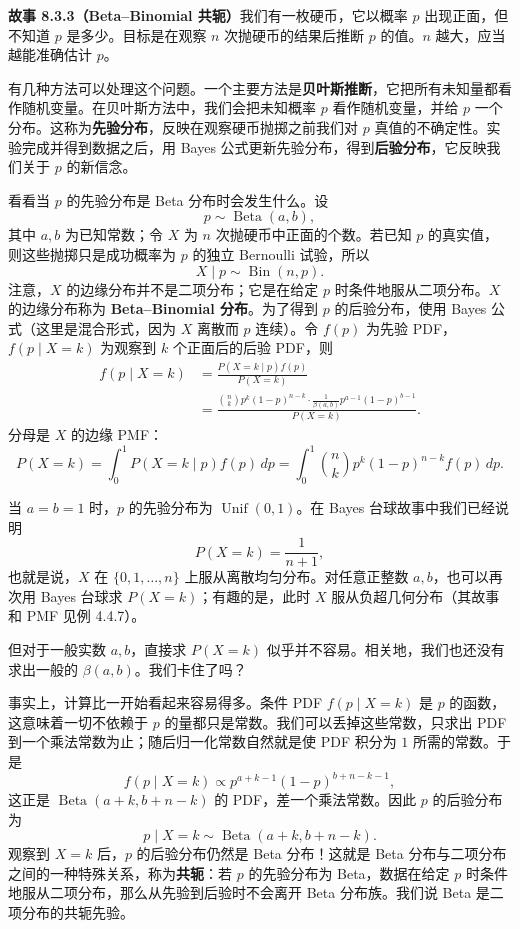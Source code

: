 \documentclass[UTF8,12pt,a4paper,fontset=fandol]{ctexart}
\begin{document}
\noindent\textbf{故事 8.3.3（Beta--Binomial 共轭）}\quad 我们有一枚硬币，它以概率 $p$ 出现正面，但不知道 $p$ 是多少。目标是在观察 $n$ 次抛硬币的结果后推断 $p$ 的值。$n$ 越大，应当越能准确估计 $p$。

有几种方法可以处理这个问题。一个主要方法是\textbf{贝叶斯推断}，它把所有未知量都看作随机变量。在贝叶斯方法中，我们会把未知概率 $p$ 看作随机变量，并给 $p$ 一个分布。这称为\textbf{先验分布}，反映在观察硬币抛掷之前我们对 $p$ 真值的不确定性。实验完成并得到数据之后，用 Bayes 公式更新先验分布，得到\textbf{后验分布}，它反映我们关于 $p$ 的新信念。

看看当 $p$ 的先验分布是 Beta 分布时会发生什么。设
\[
  p\sim\operatorname{Beta}(a,b),
\]
其中 $a,b$ 为已知常数；令 $X$ 为 $n$ 次抛硬币中正面的个数。若已知 $p$ 的真实值，则这些抛掷只是成功概率为 $p$ 的独立 Bernoulli 试验，所以
\[
  X\mid p\sim\operatorname{Bin}(n,p).
\]
注意，$X$ 的边缘分布并不是二项分布；它是在给定 $p$ 时条件地服从二项分布。$X$ 的边缘分布称为 \textbf{Beta--Binomial 分布}。为了得到 $p$ 的后验分布，使用 Bayes 公式（这里是混合形式，因为 $X$ 离散而 $p$ 连续）。令 $f(p)$ 为先验 PDF，$f(p\mid X=k)$ 为观察到 $k$ 个正面后的后验 PDF，则
\[
\begin{aligned}
  f(p\mid X=k)
  &=\frac{P(X=k\mid p)f(p)}{P(X=k)}\\
  &=\frac{{n\choose k}p^k(1-p)^{n-k}\cdot
  \frac{1}{\beta(a,b)}p^{a-1}(1-p)^{b-1}}{P(X=k)}.
\end{aligned}
\]
分母是 $X$ 的边缘 PMF：
\[
  P(X=k)=\int_0^1 P(X=k\mid p)f(p)\,dp
  =\int_0^1 {n\choose k}p^k(1-p)^{n-k}f(p)\,dp.
\]

当 $a=b=1$ 时，$p$ 的先验分布为 $\operatorname{Unif}(0,1)$。在 Bayes 台球故事中我们已经说明
\[
  P(X=k)=\frac{1}{n+1},
\]
也就是说，$X$ 在 $\{0,1,\ldots,n\}$ 上服从离散均匀分布。对任意正整数 $a,b$，也可以再次用 Bayes 台球求 $P(X=k)$；有趣的是，此时 $X$ 服从负超几何分布（其故事和 PMF 见例 4.4.7）。

但对于一般实数 $a,b$，直接求 $P(X=k)$ 似乎并不容易。相关地，我们也还没有求出一般的 $\beta(a,b)$。我们卡住了吗？

事实上，计算比一开始看起来容易得多。条件 PDF $f(p\mid X=k)$ 是 $p$ 的函数，这意味着一切不依赖于 $p$ 的量都只是常数。我们可以丢掉这些常数，只求出 PDF 到一个乘法常数为止；随后归一化常数自然就是使 PDF 积分为 $1$ 所需的常数。于是
\[
  f(p\mid X=k)\propto p^{a+k-1}(1-p)^{b+n-k-1},
\]
这正是 $\operatorname{Beta}(a+k,b+n-k)$ 的 PDF，差一个乘法常数。因此 $p$ 的后验分布为
\[
  p\mid X=k\sim\operatorname{Beta}(a+k,b+n-k).
\]
观察到 $X=k$ 后，$p$ 的后验分布仍然是 Beta 分布！这就是 Beta 分布与二项分布之间的一种特殊关系，称为\textbf{共轭}：若 $p$ 的先验分布为 Beta，数据在给定 $p$ 时条件地服从二项分布，那么从先验到后验时不会离开 Beta 分布族。我们说 Beta 是二项分布的共轭先验。
\end{document}
